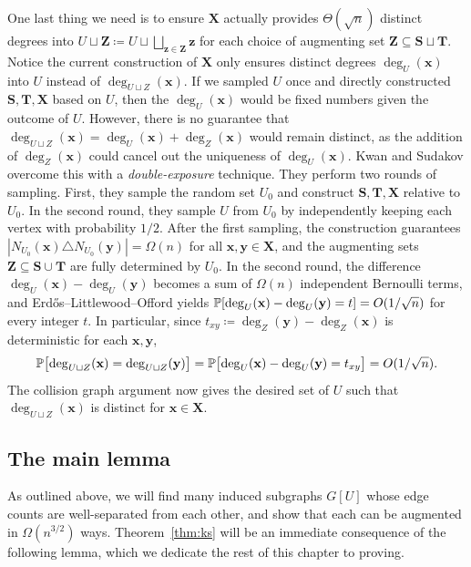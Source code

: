 One last thing we need is to ensure $\mathbf{X}$ actually provides $\Theta(\sqrt{n})$ distinct degrees into $U \sqcup \mathbf{Z} \coloneqq U \sqcup \bigsqcup_{\mathbf{z} \in \mathbf{Z}} \mathbf{z}$ for each choice of augmenting set $\mathbf{Z} \subseteq \mathbf{S} \sqcup \mathbf{T}$. Notice the current construction of $\mathbf{X}$ only ensures distinct degrees $\deg_U(\mathbf{x})$ into $U$ instead of $\deg_{U \sqcup Z}(\mathbf{x})$. If we sampled $U$ once and directly constructed $\mathbf{S}, \mathbf{T}, \mathbf{X}$ based on $U$, then the $\deg_U(\mathbf{x})$ would be fixed numbers given the outcome of $U$. However, there is no guarantee that $\deg_{U \sqcup Z}(\mathbf{x}) = \deg_{U}(\mathbf{x}) + \deg_{Z}(\mathbf{x})$ would remain distinct, as the addition of $\deg_{Z}(\mathbf{x})$ could cancel out the uniqueness of $\deg_{U}(\mathbf{x})$. Kwan and Sudakov overcome this with a \textit{double-exposure} technique. They perform two rounds of sampling. First, they sample the random set $U_0$ and construct $\mathbf{S}, \mathbf{T}, \mathbf{X}$ relative to $U_0$. In the second round, they sample $U$ from $U_0$ by independently keeping each vertex with probability $1/2$. After the first sampling, the construction guarantees $|N_{U_0}(\mathbf{x}) \triangle N_{U_0}(\mathbf{y})| = \Omega(n)$ for all $\mathbf{x}, \mathbf{y} \in \mathbf{X}$, and the augmenting sets $\mathbf{Z} \subseteq \mathbf{S} \cup \mathbf{T}$ are fully determined by $U_0$. In the second round, the difference $\deg_U(\mathbf{x}) - \deg_U(\mathbf{y})$ becomes a sum of $\Omega(n)$ independent Bernoulli terms, and Erd\H{o}s--Littlewood--Offord yields $\mathbb{P}[\operatorname{deg}_U(\mathbf{x}) - \operatorname{deg}_U(\mathbf{y}) = t] = O(1/\sqrt{n})$ for every integer $t$. In particular, since $t_{xy} \coloneqq \deg_Z(\mathbf{y}) - \deg_Z(\mathbf{x})$ is deterministic for each $\mathbf{x}, \mathbf{y}$, 
\[
  \mathbb{P}\bigl[\operatorname{deg}_{U \sqcup Z}(\mathbf{x}) = \operatorname{deg}_{U \sqcup Z}(\mathbf{y})\bigr] = \mathbb{P}\bigl[\operatorname{deg}_{U}(\mathbf{x}) - \operatorname{deg}_{U}(\mathbf{y}) = t_{xy}\bigr] = O(1/\sqrt{n}).
\]
The collision graph argument now gives the desired set of $U$ such that $\deg_{U \sqcup Z}(\mathbf{x})$ is distinct for $\mathbf{x} \in \mathbf{X}$.

\subsection{The main lemma}

As outlined above, we will find many induced subgraphs $G[U]$ whose edge counts are well-separated from each other, and show that each can be augmented in $\Omega(n^{3/2})$ ways. Theorem~\ref{thm:ks} will be an immediate consequence of the following lemma, which we dedicate the rest of this chapter to proving.

